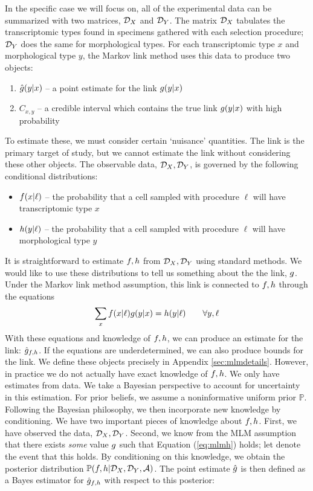 In the specific case we will focus on, all of the experimental data can be summarized with two matrices, ${\mathcal{D}_X}$ and ${\mathcal{D}_Y}$.  The matrix ${\mathcal{D}_X}$ tabulates the transcriptomic types found in specimens gathered with each selection procedure; ${\mathcal{D}_Y}$ does the same for morphological types.   For each transcriptomic type $x$ and morphological type $y$, the Markov link method uses this data to produce two objects:
%
\begin{enumerate}
    \item $\hat {g}(y|x)$ -- a point estimate for the link $g(y|x)$
    \item $C_{x,y}$ -- a credible interval which contains the true link $g(y|x)$ with high probability
\end{enumerate}
%
To estimate these, we must consider certain `nuisance' quantities.  The link is the primary target of study, but we cannot estimate the link without considering these other objects.  The observable data, ${\mathcal{D}_X},{\mathcal{D}_Y}$, is governed by the following conditional distributions:
\begin{itemize}
    \item $f(x|\ell)$ -- the probability that a cell sampled with procedure $\ell$ will have transcriptomic type $x$
    \item $h(y|\ell)$ -- the probability that a cell sampled with procedure $\ell$ will have morphological type $y$
\end{itemize}
It is straightforward to estimate $f,h$ from ${\mathcal{D}_X},{\mathcal{D}_Y}$ using standard methods.  We would like to use these distributions to tell us something about the the link, $g$.  Under the Markov link method assumption, this link is connected to $f,h$ through the equations
\begin{gather}\label{eq:mlmh}
\sum_x f(x|\ell)g(y|x)=h(y|\ell) \qquad \forall y,\ell
\end{gather}
With these equations and knowledge of $f,h$, we can produce an estimate for the link: $\hat {g}_{f,h}$.  If the equations are underdetermined, we can also produce bounds for the link.  We define these objects precisely in Appendix \ref{sec:mlmdetails}.  However, in practice we do not actually have exact knowledge of $f,h$.  We only have estimates from data.  We take a Bayesian perspective to account for uncertainty in this estimation.  For prior beliefs, we assume a noninformative uniform prior $\mathbb{P}$.  Following the Bayesian philosophy, we then incorporate new knowledge by conditioning.  We have two important pieces of knowledge about $f,h$.  First, we have observed the data, ${\mathcal{D}_X},{\mathcal{D}_Y}$.  Second, we know from the MLM assumption that there exists \emph{some} value $g$ such that Equation (\ref{eq:mlmh}) holds; let \MLMH{} denote the event that this holds.  By conditioning on this knowledge, we obtain the posterior distribution $\mathbb{P}(f,h | {\mathcal{D}_X},{\mathcal{D}_Y},\mathcal{A})$.  The \MLM{} point estimate $\hat {g}$ is then defined as a Bayes estimator for $\hat {g}_{f,h}$ with respect to this posterior:
